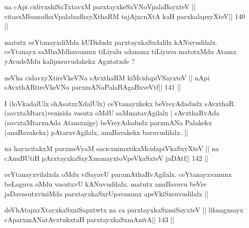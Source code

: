 \begin{shl}
na cApi cidivxshiSaTxtavxM parxtayxkeSxVNoVpalaBayxteV ||
citasxMbanodhxVpalabadhxyXthaRM tajAjxcnXtA kaH parxkalapxyXteV\hfill || 140 ||
\end{shl}

\begin{artha}
matutx ceYtanayxdiMda kUDidudx parxtayxkaSxdalilx kANuvudilalx. ceYtanayx saMbaMdhavanunx tiLiyalu adanunx tiLiyuva matotxMdu Atamx yAvudeMdu kalipxsuvudakekx Agutatxde ? 
\end{artha}

\begin{shl}
neVha cidavxyXtireVkeVNa sAvxthaRM kiMcidapiVSayxteV ||
nApi sAvxthARtireVkeVNa parxmANaPalaBAgaBxveVtf\hfill || 141 ||
\end{shl}

\begin{artha}
I (loVkadalUlx shAsatxrXdalUlx) ceYtanayxkekx beVreyAdadudx sAvxthaR. 
(savxtaMtarx)venisida vasutx oMdU saMmatavAgilalx | sAvxthaRvAda 
(savxtaMtarxnAda Atamxnige) beVreyAdadudx parxmANa Palakekx 
(anuBavakekx) pAtarxvAgilalx, anuBavakekx baruvudilalx. ||
\end{artha}

\begin{shl}
na hayxcitakxM parxmeVyaM sacicxnimxtikxMcidapiVkaSxyXteV ||
na cAnuBUtiH pArxtayxkaSxyXmanayxtoV\s peVkaSxteV jaDAtf\hfill || 142 ||
\end{shl}

\begin{artha}
ceYtanayxvilalxda oMdu viSayavU paramAthaRvAgilalx. ceYtanayxvanunx 
beLaguva oMdu vasutxvU kANuvudilalx. matutx anuBavavu beVre jaDavasutxviniMda parxtayxkaSxrUpavanunx apeVkiSxsuvudilalx ||
\end{artha}


\begin{shl}
\footnotemark[3]deVhAtapxrXtayxkaSxniSapxtwtx na ca parxtayxkaSxmiSayxteV ||
liknagxsayx cAparxmANatAvxtukxtaH  parxtayxkaSxmAnitA\hfill || 143 ||
\end{shl}

